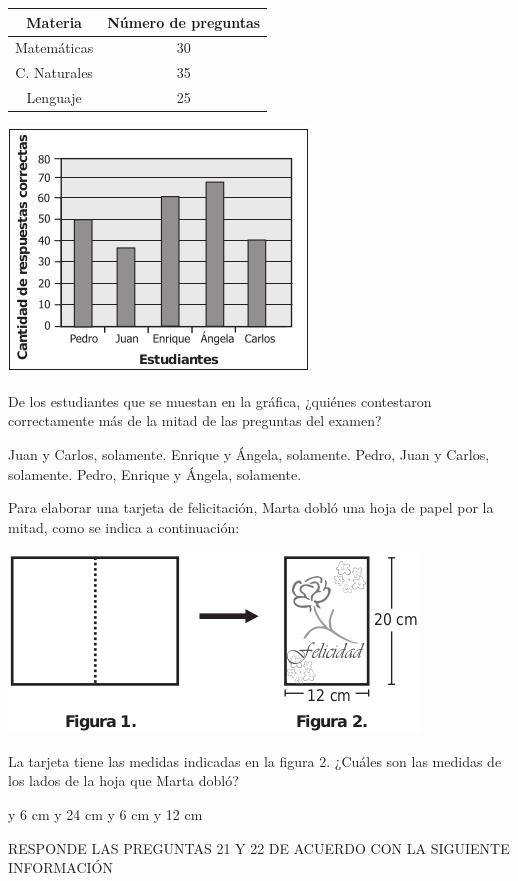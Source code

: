 \documentclass[10pt,addpoints]{exam}
\begin{document}
\begin{multicols}{2}
\begin{questions}
\begin{tabular}{|c|c|}
\hline 
Materia & Número de preguntas \\ 
\hline 
Matemáticas & 30 \\ 
\hline 
C. Naturales & 35 \\ 
\hline 
Lenguaje & 25 \\ 
\hline 
\end{tabular}
\begin{center}
\includegraphics[scale=.6]{Images/Pantallazo-18.png} 
\end{center}
De los estudiantes que se muestan en la gráfica, ¿quiénes contestaron correctamente más de la mitad de las preguntas del examen?
\begin{choices}
\choice Juan y Carlos, solamente.
\choice Enrique y Ángela, solamente.
\choice Pedro, Juan y Carlos, solamente.
\CorrectChoice Pedro, Enrique y Ángela, solamente.
\end{choices}
\question Para elaborar una tarjeta de felicitación, Marta dobló una hoja de papel por la mitad, como se indica a continuación:
\begin{center}
\includegraphics[scale=.5]{Images/Pantallazo-19.png} 
\end{center}
La tarjeta tiene las medidas indicadas en la figura 2.
¿Cuáles son las medidas de los lados de la hoja que Marta dobló?
\begin{choices}
 y 6 cm
 y 24 cm
 y 6 cm
 y 12 cm
\end{choices}
RESPONDE LAS PREGUNTAS 21 Y 22 DE ACUERDO CON LA SIGUIENTE INFORMACIÓN


\end{questions}
\end{multicols}
\end{document}
